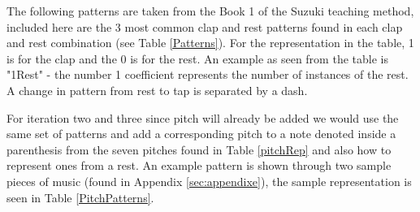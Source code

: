 The following patterns are taken from the Book 1 of the Suzuki teaching method, included here are the 3 most common clap and rest patterns found in each clap and rest combination (see Table \ref{Patterns}). For the representation in the table, 1 is for the clap and the 0 is for the rest. An example as seen from the table is "1Rest" - the number 1 coefficient represents the number of instances of the rest. A change in pattern from rest to tap is separated by a dash. 

For iteration two and three since pitch will already be added we would use the same set of patterns and add a corresponding pitch to a note denoted inside a parenthesis from the seven pitches found in Table \ref{pitchRep} and also how to represent ones from a rest. An example pattern is shown through two sample pieces of music (found in Appendix \ref{sec:appendixe}), the sample representation is seen in Table \ref{PitchPatterns}.

